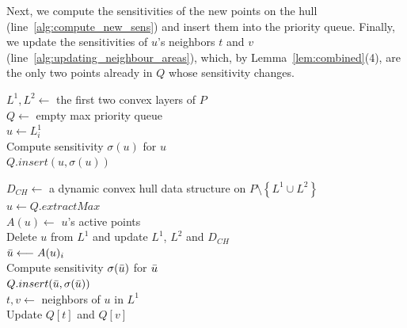 \documentclass{cccg24}
\newcommand{\lrBrackets}[1]{\left[ #1 \right]}
\newcommand{\lrCurlyBrackets}[1]{\left\{ #1 \right\}}
\newcommand{\lrParents}[1]{\left( #1 \right)}
\newcommand{\lrSize}[1]{\left| #1 \right|}
\newcommand{\sens}[1]{\sigma\!\lrParents{#1}}
\begin{document}
Next, we compute the sensitivities of the new points on the hull (line~\ref{alg:compute_new_sens}) and insert them into the priority queue. 
Finally, we update the sensitivities of $u$'s neighbors $t$ and $v$ (line~\ref{alg:updating_neighbour_areas}), which, by Lemma~\ref{lem:combined}(4), are the only two points already in $Q$ whose sensitivity changes.




\begin{algorithm} %
\caption{Weighted peeling}\label{alg:area_weighted_peeling}

$L^1, L^2 \longleftarrow$ the first two convex layers of $P$ \\ %
$Q \longleftarrow$ empty max priority queue \\
\For{$i=1$ \KwTo $\lrSize{L^1}$}
    {   
        $u \longleftarrow L^1_i$\\
        Compute sensitivity $\sens{u}$ for $u$ \\
        $Q.insert\!\lrParents{u, \sens{u}}$ \\
    }
    
$D_{CH} \longleftarrow$ a dynamic convex hull data structure on $P \setminus \lrCurlyBrackets{L^1 \cup L^2}$  \\

    {   
        $u \longleftarrow Q.extractMax$  \\
        $A(u) \longleftarrow$ $u$'s active points \\ %
        Delete $u$ from $L^1$ and update $L^1$, $L^2$ and $D_{CH}$ \\
        \For{$i=1$ \KwTo $\lrSize{A(u)}$}
        {   
            $\Bar{u} \longleftarrow A(u)_i$ \\
            Compute sensitivity $\sens{\Bar u}$ for $\Bar u$  \\ 
            $Q.insert\!\lrParents{\Bar u, \sens{\Bar u}}$ \\
        }
        $t, v \longleftarrow$ neighbors of $u$ in $L^1$ \\ 
        Update $Q\!\lrBrackets{t}$ and $Q\!\lrBrackets{v}$ \\
    }

\end{algorithm}
\end{document}

